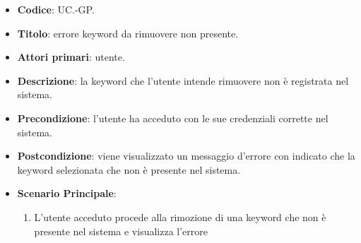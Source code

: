 	\begin{itemize}
		\item \textbf{Codice}: UC\theuccount.\thesubuccount-GP.
		\item \textbf{Titolo}: errore keyword da rimuovere non presente.
		\item \textbf{Attori primari}: utente.
		\item \textbf{Descrizione}: la keyword che l'utente intende rimuovere non è registrata nel sistema.
		\item \textbf{Precondizione}: l’utente ha acceduto con le sue credenziali corrette nel sistema.
		\item \textbf{Postcondizione}: viene visualizzato un messaggio d'errore con indicato che la keyword	selezionata che non è presente nel sistema.
		\item \textbf{Scenario Principale}:
		\begin{enumerate}
			\item L'utente acceduto procede alla rimozione di una keyword che non è presente nel sistema e visualizza l'errore
		\end{enumerate}
	\end{itemize}
	